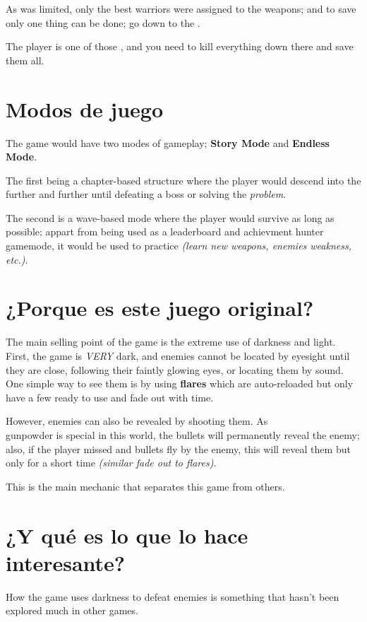 \begin{multicols}{2}
As \gunpowder was limited, only the best warriors were assigned to the \gunpowder weapons; and to save \humanity only one thing can be done; go down to the \hole.

The player is one of those \hunters, and you need to kill everything down there and save them all.



\section{Modos de juego}
The game would have two modes of gameplay; \textbf{Story Mode} and \textbf{Endless Mode}.

The first being a chapter-based structure where the player would descend into the \hole further and further until defeating a boss or solving the \hole \textit{problem}.

The second is a wave-based mode where the player would survive as long as possible; appart from being used as a leaderboard and achievment hunter gamemode, it would be used to practice \textit{(learn new weapons, enemies weakness, etc.)}.


\section{¿Porque es este juego original?}
The main selling point of the game is the extreme use of darkness and light. First, the game is \textit{VERY} dark, and enemies cannot be located by eyesight until they are close, following their faintly glowing eyes, or locating them by sound. One simple way to see them is by using \textbf{flares} which are auto-reloaded but only have a few ready to use and fade out with time.

However, enemies can also be revealed by shooting them. As \\gunpowder is special in this world, the bullets will permanently reveal the enemy; also, if the player missed and bullets fly by the enemy, this will reveal them but only for a short time \textit{(similar fade out to flares)}.

This is the main mechanic that separates this game from others.

\section{¿Y qué es lo que lo hace interesante?}
How the game uses darkness to defeat enemies is something that hasn't been explored much in other games.


\end{multicols}
